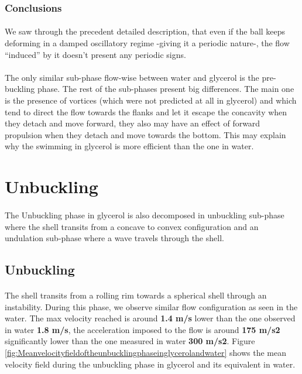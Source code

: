 \documentclass[a4paper,10pt]{report}
\begin{document}
\subsubsection{Conclusions}
\paragraph{}

We saw through the precedent detailed description, that even if the ball keeps deforming in a damped oscillatory regime -giving it a periodic nature-, the flow ``induced'' by it doesn't present any periodic signs.
\paragraph{}
The only similar sub-phase flow-wise between water and glycerol is the pre-buckling phase. The rest of the sub-phases present big differences. The main one is the presence of vortices (which were not predicted at all in glycerol) and which tend to direct the flow towards the flanks and let it escape the concavity when they detach and move forward, they also may have an effect of forward propulsion when they detach and move towards the bottom. This may explain why the swimming in glycerol is more efficient than the one in water.    

\section{Unbuckling}
\paragraph{}
The Unbuckling phase in glycerol is also decomposed in unbuckling sub-phase where the shell transits from a concave to convex configuration and an undulation sub-phase where a wave travels through the shell.

\subsection{Unbuckling}
\paragraph{}
The shell transits from a rolling rim towards a spherical shell through an instability. During this phase, we observe similar flow configuration as seen in the water.
The max velocity reached is around \textbf{1.4 m/s} lower than the one observed in water \textbf{1.8 m/s}, the acceleration imposed to the flow is around \textbf{175 m/s2} significantly lower than the one measured in water \textbf{300 m/s2}. Figure \ref{fig:Meanvelocityfieldoftheunbucklingphaseinglycerolandwater} shows the mean velocity field during the unbuckling phase in glycerol and its equivalent in water.
\end{document}
